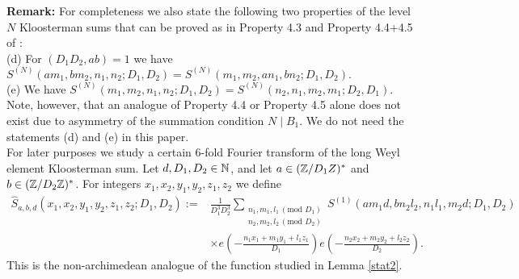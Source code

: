 \documentclass[11pt]{amsart}
\theoremstyle{plain}
\numberwithin{equation}{section}
\theoremstyle{definition}
\begin{document}
 
  
\textbf{Remark:} For completeness we also state the following two properties of the level $N$ Kloosterman sums that can be proved as in Property 4.3 and Property  4.4+4.5 of \cite{BFG}:\\
(d) For $(D_1D_2, a b) = 1$ we have
$S^{( N)}(am_1, bm_2, n_1, n_2; D_1, D_2)  = S^{(N)}(m_1, m_2, an_1, bn_2; D_1, D_2).$\\
(e) We have $S^{( N)}(m_1, m_2, n_1, n_2; D_1, D_2) = S^{( N)}(n_2, n_1, m_2, m_1; D_2, D_1).$\\
Note, however, that an analogue of Property 4.4 or Property 4.5 alone does not exist due to asymmetry of the summation condition $N \mid B_1$. We do not need the statements (d) and (e) in this paper. \\



For later purposes we study a certain 6-fold Fourier transform of the long Weyl element Kloosterman sum. Let $d, D_1, D_2 \in \Bbb{N}$,   and let $a \in (\Bbb{Z}/D_1Z)^{\ast}$ and $b \in (\Bbb{Z}/D_2\Bbb{Z})^{\ast}$. 
For integers $x_1, x_2, y_1, y_2, z_1, z_2$ we define 
\begin{equation}\label{untwist}
\begin{split}
\widehat{S}_{a, b, d}(x_1, x_2, y_1, y_2, z_1, z_2; D_1, D_2) := & \frac{1}{D_1^3D_2^3}\sum_{\substack{n_1, m_1, l_1 \, (\text{mod } D_1) \\ n_2, m_2, l_2 \, (\text{mod } D_2)}}   S^{(1)}(am_1d, bn_2l_2, n_1l_1, m_2 d;D_1, D_2) \\
& \times e\left(-\frac{n_1x_1 + m_1y_1+l_1z_1}{D_1}\right) e\left(-\frac{n_2x_2 + m_2y_2+l_2z_2}{D_2}\right).
 \end{split}
 \end{equation}
 This is the non-archimedean analogue of the function studied in Lemma \ref{stat2}. 
 
\end{document}
